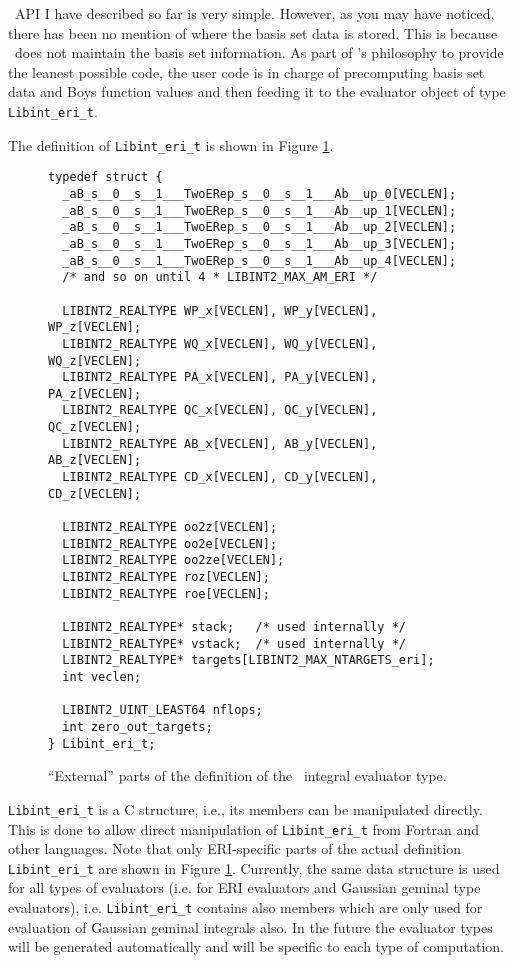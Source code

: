 \documentclass[12pt]{article}
\begin{document}
\LIBINT\ API I have described so far is very simple. However, as you may have noticed, there has been no mention of
where the basis set data is stored. This is because \LIBINT\ does not maintain the basis set information.
As part of \LIBINT 's philosophy to provide the leanest possible code, the user code
is in charge of precomputing basis set data and Boys function values and then feeding it to the evaluator object
of type {\tt Libint\_eri\_t}.

The definition of {\tt Libint\_eri\_t} is shown in Figure \ref{fig:libintt}.
\begin{figure}
\caption{\label{fig:libintt} ``External'' parts of the definition of the \LIBINT\ integral evaluator type. }
\begin{center}
\begin{minipage}[t]{0.9\linewidth}
\begin{verbatim}
typedef struct {
  _aB_s__0__s__1___TwoERep_s__0__s__1___Ab__up_0[VECLEN];
  _aB_s__0__s__1___TwoERep_s__0__s__1___Ab__up_1[VECLEN];
  _aB_s__0__s__1___TwoERep_s__0__s__1___Ab__up_2[VECLEN];
  _aB_s__0__s__1___TwoERep_s__0__s__1___Ab__up_3[VECLEN];
  _aB_s__0__s__1___TwoERep_s__0__s__1___Ab__up_4[VECLEN];
  /* and so on until 4 * LIBINT2_MAX_AM_ERI */

  LIBINT2_REALTYPE WP_x[VECLEN], WP_y[VECLEN], WP_z[VECLEN];
  LIBINT2_REALTYPE WQ_x[VECLEN], WQ_y[VECLEN], WQ_z[VECLEN];
  LIBINT2_REALTYPE PA_x[VECLEN], PA_y[VECLEN], PA_z[VECLEN];
  LIBINT2_REALTYPE QC_x[VECLEN], QC_y[VECLEN], QC_z[VECLEN];
  LIBINT2_REALTYPE AB_x[VECLEN], AB_y[VECLEN], AB_z[VECLEN];
  LIBINT2_REALTYPE CD_x[VECLEN], CD_y[VECLEN], CD_z[VECLEN];

  LIBINT2_REALTYPE oo2z[VECLEN];
  LIBINT2_REALTYPE oo2e[VECLEN];
  LIBINT2_REALTYPE oo2ze[VECLEN];
  LIBINT2_REALTYPE roz[VECLEN];
  LIBINT2_REALTYPE roe[VECLEN];
  
  LIBINT2_REALTYPE* stack;   /* used internally */
  LIBINT2_REALTYPE* vstack;  /* used internally */
  LIBINT2_REALTYPE* targets[LIBINT2_MAX_NTARGETS_eri];
  int veclen;

  LIBINT2_UINT_LEAST64 nflops;
  int zero_out_targets;
} Libint_eri_t;
\end{verbatim}
\end{minipage}
\end{center}
\end{figure}
{\tt Libint\_eri\_t} is a C structure, i.e., its members can be manipulated directly.
This is done to allow direct manipulation of {\tt Libint\_eri\_t} from
Fortran and other languages.
Note that only ERI-specific parts of the actual definition {\tt Libint\_eri\_t} are shown in Figure \ref{fig:libintt}.
Currently, the same data structure is used for all types of evaluators (i.e. for ERI evaluators
and Gaussian geminal type evaluators), i.e. {\tt Libint\_eri\_t} contains also members which are only used
for evaluation of Gaussian geminal integrals also. In the future the evaluator types will be generated
automatically and will be specific to each type of computation.
\end{document}
